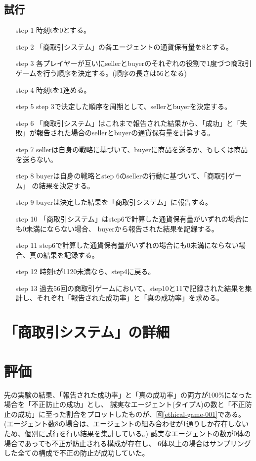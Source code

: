 \subsection{試行}
\begin{itemize}
  \item[step 1] 時刻tを0とする。
  \item[step 2] 「商取引システム」の各エージェントの通貨保有量を8とする。
  \item[step 3] 各プレイヤーが互いにsellerとbuyerのそれぞれの役割で1度づつ商取引ゲームを行う順序を決定する。(順序の長さは56となる)
  \item[step 4] 時刻tを1進める。
  \item[step 5] step 3で決定した順序を周期として、sellerとbuyerを決定する。
  \item[step 6] 「商取引システム」はこれまで報告された結果から、「成功」と「失敗」が報告された場合のsellerとbuyerの通貨保有量を計算する。
  \item[step 7] sellerは自身の戦略に基づいて、buyerに商品を送るか、もしくは商品を送らない。
  \item[step 8] buyerは自身の戦略とstep 6のsellerの行動に基づいて、「商取引ゲーム」 の結果を決定する。
  \item[step 9] buyerは決定した結果を「商取引システム」に報告する。 
  \item[step 10] 「商取引システム」はstep6で計算した通貨保有量がいずれの場合にも0未満にならない場合、 buyerから報告された結果を記録する。
  \item[step 11] step6で計算した通貨保有量がいずれの場合にも0未満にならない場合、真の結果を記録する。
  \item[step 12] 時刻tが1120未満なら、step4に戻る。
  \item[step 13] 過去56回の商取引ゲームにおいて、step10と11で記録された結果を集計し、それぞれ「報告された成功率」と「真の成功率」を求める。
\end{itemize}

\section{「商取引システム」の詳細}


\section{評価}
先の実験の結果、「報告された成功率」と「真の成功率」の両方が100\%になった場合を「不正防止の成功」とし、
誠実なエージェント(タイプA)の数と「不正防止の成功」に至った割合をプロットしたものが、図\ref{ethical-game-001}である。
(エージェント数8の場合は、エージェントの組み合わせが1通りしか存在しないため、個別に試行を行い結果を集計している。)
誠実なエージェントの数が0体の場合であっても不正が防止される構成が存在し、
6体以上の場合はサンプリングした全ての構成で不正の防止が成功していた。

